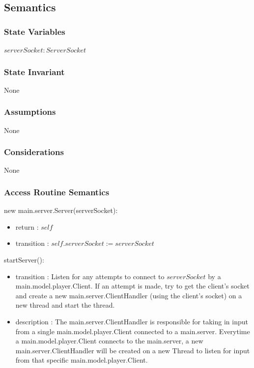\documentclass[12pt, titlepage]{article}
\begin{document}
    \subsection* {Semantics}
    
    \subsubsection* {State Variables}
        $\mathit{serverSocket}: ServerSocket$\\

    \subsubsection* {State Invariant}
        None
    
    \subsubsection* {Assumptions}
        None
    
    \subsubsection* {Considerations}
        None
    
    \subsubsection* {Access Routine Semantics}
    
        \noindent new main.server.Server(serverSocket):
        \begin{itemize}
        \item return : $self$
        \item transition : $self.serverSocket := serverSocket$
        \end{itemize}
        
        \noindent startServer():
        \begin{itemize}
        \item transition : Listen for any attempts to connect to $serverSocket$ by a main.model.player.Client. If an attempt is made, try to get the client's socket and create a new main.server.ClientHandler (using the client's socket) on a new thread and start the thread.
        \item description : The main.server.ClientHandler is responsible for taking in input from a single main.model.player.Client connected to a main.server. Everytime a main.model.player.Client connects to the main.server, a new main.server.ClientHandler will be created on a new Thread to listen for input from that specific main.model.player.Client.
        \end{itemize}
        
\end{document}
